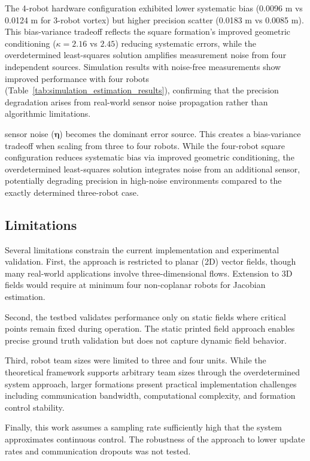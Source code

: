 \documentclass[lettersize,journal]{IEEEtran}
\begin{document}
The 4-robot hardware configuration exhibited lower systematic bias (0.0096 m vs 0.0124 m for 3-robot vortex) but higher precision scatter (0.0183 m vs 0.0085 m). This bias-variance tradeoff reflects the square formation's improved geometric conditioning ($\kappa = 2.16$ vs $2.45$) reducing systematic errors, while the overdetermined least-squares solution amplifies measurement noise from four independent sources. Simulation results with noise-free measurements show improved performance with four robots (Table~\ref{tab:simulation_estimation_results}), confirming that the precision degradation arises from real-world sensor noise propagation rather than algorithmic limitations.

sensor noise ($\boldsymbol{\eta}$) becomes the dominant error source. This creates a bias-variance tradeoff when scaling from three to four robots. While the four-robot square configuration reduces systematic bias via improved geometric conditioning, the overdetermined least-squares solution integrates noise from an additional sensor, potentially degrading precision in high-noise environments compared to the exactly determined three-robot case.


\subsection{Limitations}

Several limitations constrain the current implementation and experimental validation. First, the approach is restricted to planar (2D) vector fields, though many real-world applications involve three-dimensional flows. Extension to 3D fields would require at minimum four non-coplanar robots for Jacobian estimation.

Second, the testbed validates performance only on static fields where critical points remain fixed during operation. The static printed field approach enables precise ground truth validation but does not capture dynamic field behavior.

Third, robot team sizes were limited to three and four units. While the theoretical framework supports arbitrary team sizes through the overdetermined system approach, larger formations present practical implementation challenges including communication bandwidth, computational complexity, and formation control stability.

Finally, this work assumes a sampling rate sufficiently high that the system approximates continuous control. The robustness of the approach to lower update rates and communication dropouts was not tested.
\end{document}
